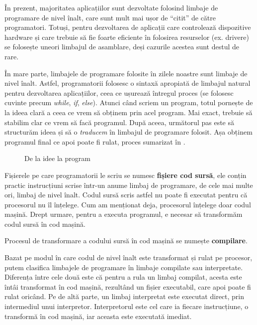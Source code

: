 În prezent, majoritatea aplicațiilor sunt dezvoltate folosind limbaje de
programare de nivel înalt, care sunt mult mai ușor de “citit” de către
programatori. Totuși, pentru dezvoltarea de aplicații care controlează
dispozitive hardware și care trebuie să fie foarte eficiente în folosirea
resurselor (ex. drivere) se folosește uneori limbajul de asamblare, deși
cazurile acestea sunt destul de rare.

În mare parte, limbajele de programare folosite în zilele noastre sunt limbaje
de nivel înalt. Astfel, programatorii folosesc o sintaxă apropiată de limbajul
natural pentru dezvoltarea aplicațiilor, ceea ce ușurează întregul proces (se
folosesc cuvinte precum \textit{while}, \textit{if}, \textit{else}). Atunci
când scriem un program, totul pornește de la ideea clară a ceea ce vrem să obținem
prin acel program. Mai exact, trebuie să stabilim clar ce vrem să facă
programul. După aceea, următorul pas este să structurăm ideea și să o
\textit{traducem} în limbajul de programare folosit. Așa obținem programul final
ce apoi poate fi rulat, proces sumarizat în .

\begin{figure}[htbp]
  \centering
  \def\svgwidth{\columnwidth}
  
  \caption{De la idee la program}
  \label{fig:appdev:idea-to-program}
\end{figure}

Fișierele pe care programatorii le scriu se numesc \textbf{fișiere cod sursă}, ele conțin
practic instrucțiuni scrise într-un anume limbaj de programare, de cele mai
multe ori, limbaj de nivel înalt. Codul sursă scris astfel nu poate fi executat
pentru că procesorul nu îl înțelege. Cum am menționat deja, procesorul înțelege
doar codul mașină. Drept urmare, pentru a executa programul, e necesar să
transformăm codul sursă în cod mașină.

Procesul de transformare a codului sursă în cod mașină se numește \textbf{compilare}.

Bazat pe modul în care codul de nivel înalt este transformat și rulat pe
procesor, putem clasifica limbajele de programare în limbaje compilate sau
interpretate. Diferența între cele două este că pentru a rula un limbaj
compilat, acesta este întâi transformat în cod mașină, rezultând un fișier
executabil, care apoi poate fi rulat oricând. Pe de altă parte, un limbaj
interpretat este executat direct, prin intermediul unui interpretor.
Interpretorul este cel care ia fiecare instrucțiune, o transformă în cod mașină,
iar aceasta este executată imediat.


